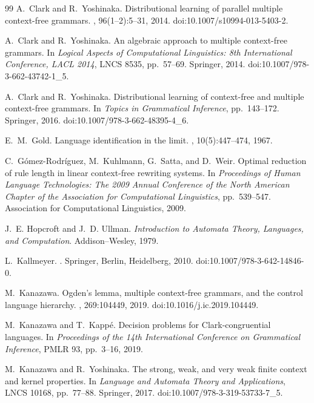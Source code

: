 \documentclass[11pt,a4paper]{article}
\numberwithin{equation}{section}
\theoremstyle{plain}
\theoremstyle{definition}
\theoremstyle{remark}
\begin{document}
\begin{thebibliography}{99}
A.~Clark and R.~Yoshinaka.
\newblock Distributional learning of parallel multiple context-free grammars.
, 96(1--2):5--31, 2014.
\newblock doi:10.1007/s10994-013-5403-2.


A.~Clark and R.~Yoshinaka.
\newblock An algebraic approach to multiple context-free grammars.
\newblock In {\em Logical Aspects of Computational Linguistics: 8th International
Conference, LACL 2014}, LNCS 8535, pp.~57--69. Springer, 2014.
\newblock doi:10.1007/978-3-662-43742-1\_5.

A.~Clark and R.~Yoshinaka.
\newblock Distributional learning of context-free and multiple context-free
grammars.
\newblock In {\em Topics in Grammatical Inference}, pp.~143--172. Springer,
2016.
\newblock doi:10.1007/978-3-662-48395-4\_6.

E.~M.~Gold.
\newblock Language identification in the limit.
, 10(5):447--474, 1967.

C.~G\'omez-Rodr\'iguez, M.~Kuhlmann, G.~Satta, and D.~Weir.
\newblock Optimal reduction of rule length in linear context-free rewriting systems.
\newblock In {\em Proceedings of Human Language Technologies: The 2009 Annual
Conference of the North American Chapter of the Association for Computational
Linguistics}, pp.~539--547. Association for Computational Linguistics, 2009.

J.~E. Hopcroft and J.~D. Ullman.
\newblock \emph{Introduction to Automata Theory, Languages, and Computation}.
\newblock Addison--Wesley, 1979.

L.~Kallmeyer.
.
\newblock Springer, Berlin, Heidelberg, 2010.
\newblock doi:10.1007/978-3-642-14846-0.

M.~Kanazawa.
\newblock Ogden's lemma, multiple context-free grammars, and the control language hierarchy.
, 269:104449, 2019.
\newblock doi:10.1016/j.ic.2019.104449.

M.~Kanazawa and T.~Kapp\'{e}.
\newblock Decision problems for Clark-congruential languages.
\newblock In {\em Proceedings of the 14th International Conference on
Grammatical Inference}, PMLR 93, pp.~3--16, 2019.

M.~Kanazawa and R.~Yoshinaka.
\newblock The strong, weak, and very weak finite context and kernel properties.
\newblock In {\em Language and Automata Theory and Applications}, LNCS 10168,
pp.~77--88. Springer, 2017.
\newblock doi:10.1007/978-3-319-53733-7\_5.


\end{thebibliography}
\end{document}
